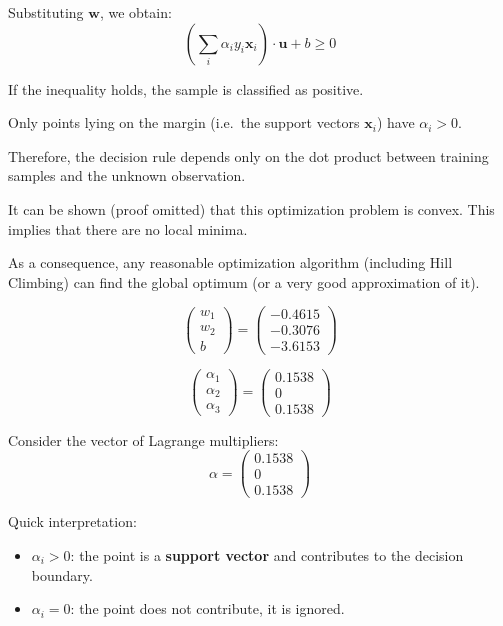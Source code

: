 Substituting $\mathbf{w}$, we obtain:
\[
\left( \sum_i \alpha_i y_i \mathbf{x}_i \right) \cdot \mathbf{u} + b \ge 0
\]

If the inequality holds, the sample is classified as positive.

Only points lying on the margin (i.e.\ the support vectors $\mathbf{x}_i$) have $\alpha_i > 0$.

Therefore, the decision rule depends only on the dot product between training samples and the unknown observation.


It can be shown (proof omitted) that this optimization problem is convex.
This implies that there are no local minima.

As a consequence, any reasonable optimization algorithm (including Hill Climbing) can find the global optimum (or a very good approximation of it).


\[
\begin{pmatrix}
w_1 \\
w_2 \\
b
\end{pmatrix}
=
\begin{pmatrix}
-0.4615 \\
-0.3076 \\
-3.6153
\end{pmatrix}
\]

\[
\begin{pmatrix}
\alpha_1 \\
\alpha_2 \\
\alpha_3
\end{pmatrix}
=
\begin{pmatrix}
0.1538 \\
0 \\
0.1538
\end{pmatrix}
\]

Consider the vector of Lagrange multipliers:
\[
\alpha = 
\begin{pmatrix} 0.1538 \\ 0 \\ 0.1538 \end{pmatrix}
\]

Quick interpretation:
\begin{itemize}
    \item $\alpha_i > 0$: the point is a \textbf{support vector} and contributes to the decision boundary.
    \item $\alpha_i = 0$: the point does not contribute, it is ignored.
\end{itemize}

